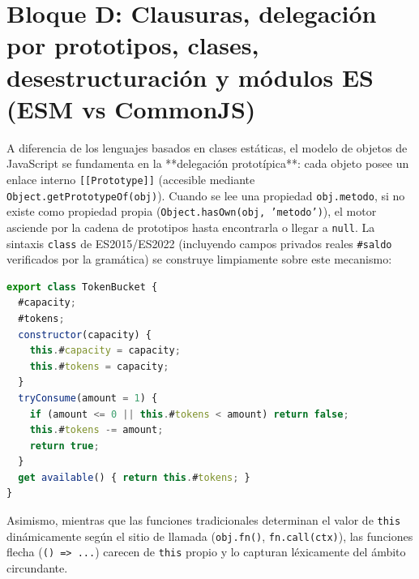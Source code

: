 \documentclass{book}
\begin{document}
\section{Bloque D: Clausuras, delegación por prototipos, clases, desestructuración y módulos ES (ESM vs CommonJS)}

A diferencia de los lenguajes basados en clases estáticas, el modelo de objetos de JavaScript se fundamenta en la **delegación prototípica**: cada objeto posee un enlace interno \texttt{[[Prototype]]} (accesible mediante \texttt{Object.getPrototypeOf(obj)}). Cuando se lee una propiedad \texttt{obj.metodo}, si no existe como propiedad propia (\texttt{Object.hasOwn(obj, 'metodo')}), el motor asciende por la cadena de prototipos hasta encontrarla o llegar a \texttt{null}. La sintaxis \texttt{class} de ES2015/ES2022 (incluyendo campos privados reales \texttt{\#saldo} verificados por la gramática) se construye limpiamente sobre este mecanismo:
\begin{lstlisting}[style=studium,language={JavaScript}]
export class TokenBucket {
  #capacity;
  #tokens;
  constructor(capacity) {
    this.#capacity = capacity;
    this.#tokens = capacity;
  }
  tryConsume(amount = 1) {
    if (amount <= 0 || this.#tokens < amount) return false;
    this.#tokens -= amount;
    return true;
  }
  get available() { return this.#tokens; }
}
\end{lstlisting}
Asimismo, mientras que las funciones tradicionales determinan el valor de \texttt{this} dinámicamente según el sitio de llamada (\texttt{obj.fn()}, \texttt{fn.call(ctx)}), las funciones flecha (\texttt{() => ...}) carecen de \texttt{this} propio y lo capturan léxicamente del ámbito circundante.
\end{document}
